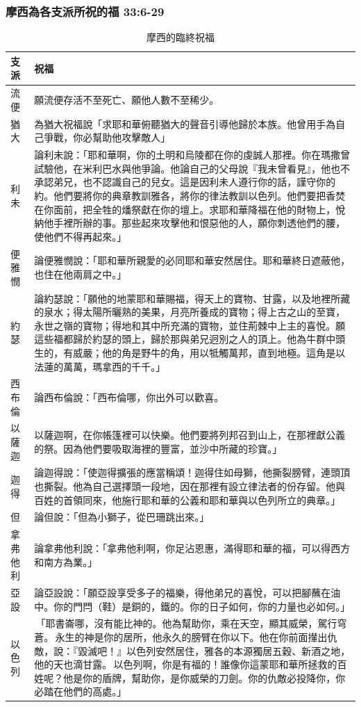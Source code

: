 \subsubsection{摩西為各支派所祝的福 33:6-29}
\begin{table}[H]
\begin{tabular}{ p{1.45cm}|p{15.8cm}} \toprule
支派&祝福             \\\hline
流便&願流便存活不至死亡、願他人數不至稀少。\\\hline
猶大 
&為猶大祝福說「求耶和華俯聽猶大的聲音引導他歸於本族。他曾用手為自己爭戰，你必幫助他攻擊敵人」 \\\hline
利未&論利未說：「耶和華啊，你的土明和烏陵都在你的虔誠人那裡。你在瑪撒曾試驗他，在米利巴水與他爭論。他論自己的父母說『我未曾看見』，他也不承認弟兄，也不認識自己的兒女。這是因利未人遵行你的話，謹守你的約。他們要將你的典章教訓雅各，將你的律法教訓以色列。他們要把香焚在你面前，把全牲的燔祭獻在你的壇上。求耶和華降福在他的財物上，悅納他手裡所辦的事。那些起來攻擊他和恨惡他的人，願你刺透他們的腰，使他們不得再起來。」 \\\hline
便雅憫&論便雅憫說：「耶和華所親愛的必同耶和華安然居住。耶和華終日遮蔽他，也住在他兩肩之中。」 \\\hline
約瑟&論約瑟說：「願他的地蒙耶和華賜福，得天上的寶物、甘露，以及地裡所藏的泉水；得太陽所曬熟的美果，月亮所養成的寶物；得上古之山的至寶，永世之嶺的寶物；得地和其中所充滿的寶物，並住荊棘中上主的喜悅。願這些福都歸於約瑟的頭上，歸於那與弟兄迥別之人的頂上。他為牛群中頭生的，有威嚴；他的角是野牛的角，用以牴觸萬邦，直到地極。這角是以法蓮的萬萬，瑪拿西的千千。」\\\hline
西布倫&論西布倫說：「西布倫哪，你出外可以歡喜。\\\hline
以薩迦&以薩迦啊，在你帳篷裡可以快樂。他們要將列邦召到山上，在那裡獻公義的祭。因為他們要吸取海裡的豐富，並沙中所藏的珍寶。」 \\\hline
迦得&論迦得說：「使迦得擴張的應當稱頌！迦得住如母獅，他撕裂膀臂，連頭頂也撕裂。他為自己選擇頭一段地，因在那裡有設立律法者的份存留。他與百姓的首領同來，他施行耶和華的公義和耶和華與以色列所立的典章。」 \\\hline
但&論但說：「但為小獅子，從巴珊跳出來。」  \\\hline
拿弗他利&論拿弗他利說：「拿弗他利啊，你足沾恩惠，滿得耶和華的福，可以得西方和南方為業。」  \\\hline
亞設&論亞設說：「願亞設享受多子的福樂，得他弟兄的喜悅，可以把腳蘸在油中。你的門閂（鞋）是銅的，鐵的。你的日子如何，你的力量也必如何。」\\\hline
以色列& 「耶書崙哪，沒有能比神的。他為幫助你，乘在天空，顯其威榮，駕行穹蒼。 永生的神是你的居所，他永久的膀臂在你以下。他在你前面攆出仇敵，說：『毀滅吧！』以色列安然居住，雅各的本源獨居五穀、新酒之地，他的天也滴甘露。 以色列啊，你是有福的！誰像你這蒙耶和華所拯救的百姓呢？他是你的盾牌，幫助你，是你威榮的刀劍。你的仇敵必投降你，你必踏在他們的高處。」 \\\hline
\bottomrule
\end{tabular}
\caption{摩西的臨終祝福}
\label{table:sci}
\end{table}



